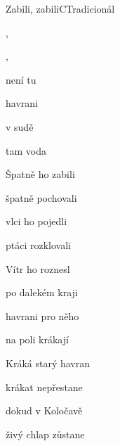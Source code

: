 \begin{song}{Zabili, zabili}{C}{Tradicionál}

\begin{SBVerse}

, 

 

, 

 

\end{SBVerse}

\begin{SBChorus}

není tu

havrani 

 v sudě

 tam voda 

  

\end{SBChorus}

\begin{SBVerse}

Špatně ho zabili

špatně pochovali

vlci ho pojedli

ptáci rozklovali

\end{SBVerse}

\begin{SBChorus}

\end{SBChorus}

\begin{SBVerse}

Vítr ho roznesl

po dalekém kraji

havrani pro něho

na poli krákají

\end{SBVerse}

\begin{SBChorus}

\end{SBChorus}

\begin{SBVerse}

Kráká starý havran

krákat nepřestane

dokud v Koločavě

živý chlap zůstane

\end{SBVerse}

\begin{SBChorus}

\end{SBChorus}

\end{song}

\clearpage